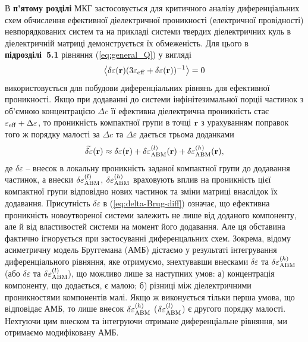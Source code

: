 \documentclass[twoside,a4paper,14pt]{vakaref-utf8}
\begin{document}
В {\bf п'ятому розділі} МКГ застосовується для критичного аналізу диференціальних схем обчислення ефективної діелектричної проникності (електричної провідності) невпорядкованих систем та на прикладі системи твердих діелектричних куль в діелектричній матриці демонструється їх  обмеженість. Для цього в {\bf підрозділі~5.1} рівняння (\ref{eq:general_Q}) у вигляді $$\left\langle \delta\varepsilon({\bf r})(3\varepsilon_{\rm eff} + \delta\varepsilon({\bf r}))^{-1} \right\rangle = 0$$
використовується для побудови диференціальних рівнянь для ефективної проникності. Якщо при додаванні до системи інфінітезимальної порції частинок з об'ємною концентрацією $\Delta c$ її ефективна діелектрична проникність стає $\varepsilon_{\rm eff} + \Delta\varepsilon$, то проникність компактної групи в точці $\bf r$ з урахуванням поправок того ж порядку малості за $\Delta c$ та $\Delta\varepsilon$ дається трьома доданками
\begin{equation}\label{eq:delta-Brug-diff}
\begin{split}
\widetilde{\delta\varepsilon} ({\bf r}) \approx \delta\varepsilon ({\bf r})+ \delta\varepsilon_{\rm ABM}^{(l)} ({\bf r}) + \delta\varepsilon_{\rm ABM}^{(h)} ({\bf r}) ,
\end{split}
\end{equation}
де $\delta\varepsilon$ -- внесок в локальну проникність заданої компактної групи до додавання частинок, а внески $\delta\varepsilon_{\rm ABM}^{(l)}$, $\delta\varepsilon_{\rm ABM}^{(h)}$ враховують  вплив на проникність цієї компактної групи відповідно нових частинок та зміни матриці внаслідок їх додавання. 
Присутність $\delta\varepsilon$ в (\ref{eq:delta-Brug-diff}) означає, що ефективна проникність новоутвореної системи залежить не лише від доданого компоненту, але й від властивостей системи на момент його додавання. Але ця обставина фактично ігнорується при застосуванні диференцальних схем. Зокрема, відому асиметричну модель Бруггемана (АМБ) дістаємо у результаті інтегрування диференціального рівняння, яке отримуємо, знехтувавши внесками $\delta\varepsilon $ та $\delta\varepsilon_{\rm ABM}^{(h)}$ 
(або $\delta\varepsilon $ та $\delta\varepsilon_{\rm ABM}^{(l)}$), що можливо лише за наступних умов: 
а) концентрація компоненту, що додається, є малою;
б) різниці між діелектричними проникностями компонентів малі.
Якщо ж виконується тільки перша умова, що відповідає АМБ, то лише внесок $\delta\varepsilon_{\rm ABM}^{(h)}$ ($\delta\varepsilon_{\rm ABM}^{(l)}$) є другого порядку малості. Нехтуючи цим внеском та інтегруючи отримане диференціальне рівняння, ми отримаємо модифіковану АМБ. 
\end{document}
